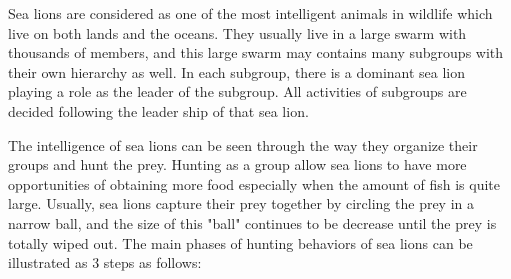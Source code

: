\documentclass[a4paper,13pt,2p]{report}
\begin{document}
	Sea lions are considered as one of the most intelligent animals in wildlife which live on both lands and the oceans. They usually live in a large swarm with thousands of members, and this large swarm may contains many subgroups with their own hierarchy as well. In each subgroup, there is a dominant sea lion playing a role as the leader of the subgroup. All activities of subgroups are decided following the leader ship of that sea lion.
	
	
	The intelligence of sea lions can be seen through the way they organize their groups and hunt the prey. Hunting as a group allow sea lions to have more opportunities of obtaining more food especially when the amount of fish is quite large. Usually, sea lions capture their prey together by circling the prey in a narrow ball, and the size of this "ball" continues to be decrease until the prey is totally wiped out. The main phases of hunting behaviors of sea lions can be illustrated as 3 steps as follows:
	
\end{document}
